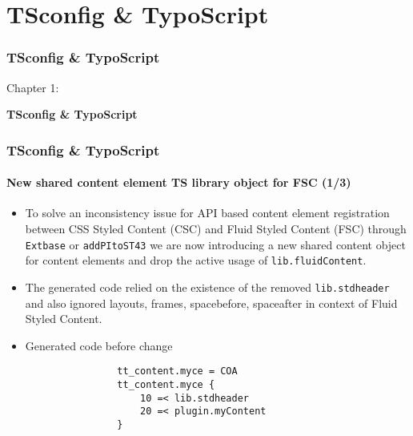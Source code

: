%

\section{TSconfig \& TypoScript}
\begin{frame}[fragile]
	\frametitle{TSconfig \& TypoScript}

	\begin{center}\huge{Chapter 1:}\end{center}
	\begin{center}\huge{\color{typo3darkgrey}\textbf{TSconfig \& TypoScript}}\end{center}

\end{frame}


\begin{frame}[fragile]
	\frametitle{TSconfig \& TypoScript}
	\framesubtitle{New shared content element TS library object for FSC (1/3)}

	\begin{itemize}
		\item To solve an inconsistency issue for API based content element registration between
			CSS Styled Content (CSC) and Fluid Styled Content (FSC) through \texttt{Extbase} or
			\texttt{addPItoST43} we are now introducing a new shared content object for content elements
			and drop the active usage of \texttt{lib.fluidContent}.

		\item The generated code relied on the existence of the removed \texttt{lib.stdheader}
			and also ignored layouts, frames, spacebefore, spaceafter in context of Fluid Styled
			Content.

		\item Generated code before change

			\begin{lstlisting}
				tt_content.myce = COA
				tt_content.myce {
				    10 =< lib.stdheader
				    20 =< plugin.myContent
				}
			\end{lstlisting}

	\end{itemize}

\end{frame}

